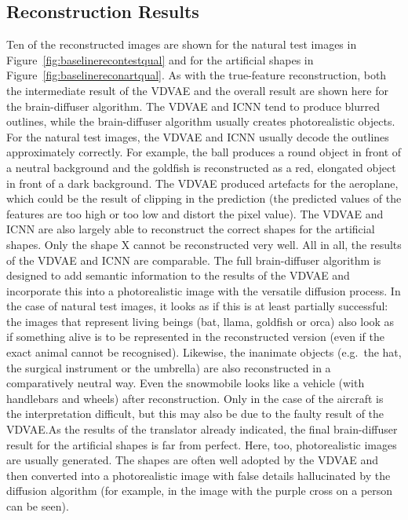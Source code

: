 \subsection{Reconstruction Results}
Ten of the reconstructed images are shown for the natural test images in Figure~\ref{fig:baselinerecontestqual} and for the artificial shapes in Figure~\ref{fig:baselinereconartqual}. As with the true-feature reconstruction, both the intermediate result of the VDVAE and the overall result are shown here for the brain-diffuser algorithm. The VDVAE and ICNN tend to produce blurred outlines, while the brain-diffuser algorithm usually creates photorealistic objects. For the natural test images, the VDVAE and ICNN usually decode the outlines approximately correctly. For example, the ball produces a round object in front of a neutral background and the goldfish is reconstructed as a red, elongated object in front of a dark background. The VDVAE produced artefacts for the aeroplane, which could be the result of clipping in the prediction (the predicted values of the features are too high or too low and distort the pixel value). The VDVAE and ICNN are also largely able to reconstruct the correct shapes for the artificial shapes. Only the shape X cannot be reconstructed very well. All in all, the results of the VDVAE and ICNN are comparable. The full brain-diffuser algorithm is designed to add semantic information to the results of the VDVAE and incorporate this into a photorealistic image with the versatile diffusion process. In the case of natural test images, it looks as if this is at least partially successful: the images that represent living beings (bat, llama, goldfish or orca) also look as if something alive is to be represented in the reconstructed version (even if the exact animal cannot be recognised). Likewise, the inanimate objects (e.g.\ the hat, the surgical instrument or the umbrella) are also reconstructed in a comparatively neutral way. Even the snowmobile looks like a vehicle (with handlebars and wheels) after reconstruction. Only in the case of the aircraft is the interpretation difficult, but this may also be due to the faulty result of the VDVAE.\@ As the results of the translator already indicated, the final brain-diffuser result for the artificial shapes is far from perfect. Here, too, photorealistic images are usually generated. The shapes are often well adopted by the VDVAE and then converted into a photorealistic image with false details hallucinated by the diffusion algorithm (for example, in the image with the purple cross on a person can be seen). 

